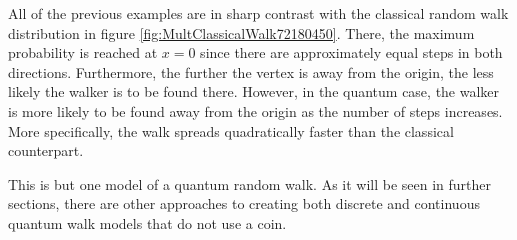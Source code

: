 \documentclass[../../dissertation.tex]{subfiles}
\begin{document}
All of the previous examples are in sharp contrast with the classical random
walk distribution in figure \ref{fig:MultClassicalWalk72180450}. There, the maximum
probability is reached at $x=0$ since there are approximately equal steps in
both directions.  Furthermore, the further the vertex is away from the origin,
the less likely the walker is to be found there. However, in the quantum case,
the walker is more likely to be found away from the origin as the number of
steps increases.  More specifically, the walk spreads quadratically faster than
the classical counterpart.\par

This is but one model of a quantum random walk. As it will be seen in further
sections, there are other approaches to creating both discrete and continuous
quantum walk models that do not use a coin. 
\end{document}
